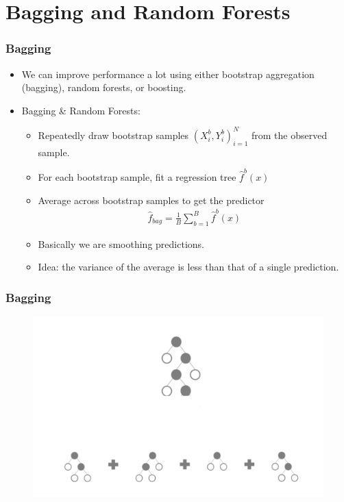 \documentclass[
  shownotes,
  xcolor={svgnames},
  hyperref={colorlinks,citecolor=DarkBlue,linkcolor=DarkRed,urlcolor=DarkBlue}
  , aspectratio=169]{beamer}
\begin{document}
\section{Bagging and Random Forests }
\begin{frame}[fragile]
\frametitle{Bagging}

\begin{itemize}
  \item We can improve performance a lot using either bootstrap aggregation (bagging), random forests, or boosting.
  \item Bagging \& Random Forests:
    \begin{itemize}
      \item Repeatedly draw bootstrap samples $(X_i^b,Y_i^b)_{i=1}^N$ from the observed sample.
      \pause
      \item For each bootstrap sample, fit a regression tree $\hat{f}^b(x)$
      \pause
      \item Average across bootstrap samples to get the predictor
      \begin{align}
        \hat{f}_{bag} =\frac{1}{B}\sum_{b=1}^B \hat{f}^b(x)
      \end{align}
\item Basically we are smoothing predictions. 
\item Idea: the variance of the average is less than that of a single prediction.
\end{itemize}

\end{itemize}

\end{frame}

\begin{frame}[fragile]
\frametitle{Bagging}

\begin{figure}[H] \centering
            \captionsetup{justification=centering}
              \includegraphics[scale=0.4]{figures/trees_to_forests.png}
 \end{figure}
\end{frame}
\end{document}
